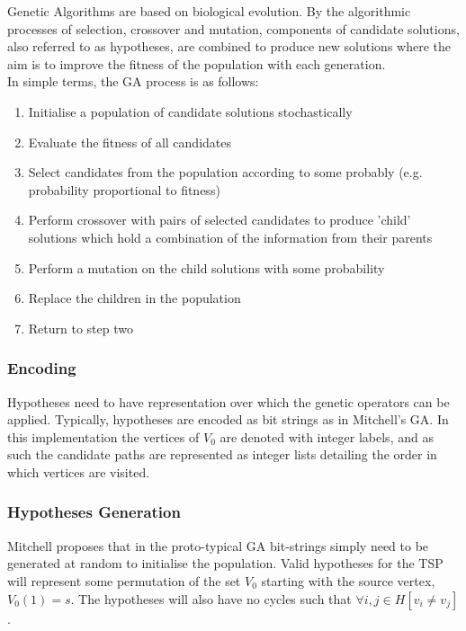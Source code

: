 \documentclass[
	a4paper, %
	10pt, %
	unnumberedsections, %
	twoside, %
]{LTJournalArticle}
\begin{document}
Genetic Algorithms are based on biological evolution. By the algorithmic processes of selection, crossover and mutation, components of candidate solutions, also referred to as hypotheses, are combined to produce new solutions where the aim is to improve the fitness of the population with each generation. \\

In simple terms, the GA process is as follows: 
\begin{enumerate}
	\item Initialise a population of candidate solutions stochastically 
	\item Evaluate the fitness of all candidates 
	\item Select candidates from the population according to some probably (e.g. probability proportional to fitness) 
	\item Perform crossover with pairs of selected candidates to produce 'child' solutions which hold a combination of the information from their parents 
	\item Perform a mutation on the child solutions with some probability
	\item Replace the children in the population 
	\item Return to step two 
\end{enumerate} 

\subsubsection{Encoding} Hypotheses need to have representation over which the genetic operators can be applied. Typically, hypotheses are encoded as bit strings \cite{mitchell:97} as in Mitchell's GA. In this implementation the vertices of \(V_{0}\) are denoted with integer labels, and as such the candidate paths are represented as integer lists detailing the order in which vertices are visited. \\

\subsubsection{Hypotheses Generation} Mitchell proposes that in the proto-typical GA bit-strings simply need to be generated at random to initialise the population. Valid hypotheses for the TSP will represent some permutation of the set \(V_{0}\) starting with the source vertex, \(V_{0}(1) = s\). The hypotheses will also have no cycles such that \(\forall i, j \in H [v_{i} \neq v_{j}] \). 
\end{document}
